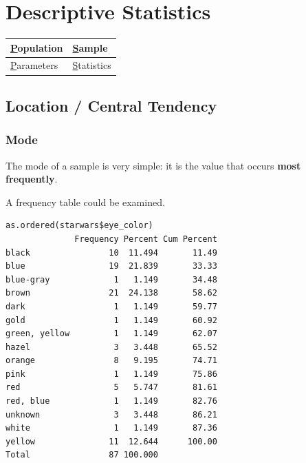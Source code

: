 \documentclass[
  letterpaper,
  DIV=11,
  numbers=noendperiod]{scrartcl}
\newenvironment{Shaded}{\begin{snugshade}}{\end{snugshade}}
\newcommand{\AttributeTok}[1]{\textcolor[rgb]{0.40,0.45,0.13}{#1}}
\newcommand{\ConstantTok}[1]{\textcolor[rgb]{0.56,0.35,0.01}{#1}}
\newcommand{\FunctionTok}[1]{\textcolor[rgb]{0.28,0.35,0.67}{#1}}
\newcommand{\NormalTok}[1]{\textcolor[rgb]{0.00,0.23,0.31}{#1}}
\newcommand{\SpecialCharTok}[1]{\textcolor[rgb]{0.37,0.37,0.37}{#1}}
\begin{document}
\section{Descriptive Statistics}\label{descriptive-statistics}

\begin{longtable}[]{@{}ll@{}}
\toprule\noalign{}
\ul{P}opulation & \ul{S}ample \\
\midrule\noalign{}
\endhead
\bottomrule\noalign{}
\endlastfoot
\ul{P}arameters & \ul{S}tatistics \\
\end{longtable}

\subsection{Location / Central
Tendency}\label{location-central-tendency}

\subsubsection{Mode}\label{mode}

The mode of a sample is very simple: it is the value that occurs
\textbf{most frequently}.~

A frequency table could be examined.

\begin{Shaded}
\end{Shaded}

\begin{verbatim}
as.ordered(starwars$eye_color) 
              Frequency Percent Cum Percent
black                10  11.494       11.49
blue                 19  21.839       33.33
blue-gray             1   1.149       34.48
brown                21  24.138       58.62
dark                  1   1.149       59.77
gold                  1   1.149       60.92
green, yellow         1   1.149       62.07
hazel                 3   3.448       65.52
orange                8   9.195       74.71
pink                  1   1.149       75.86
red                   5   5.747       81.61
red, blue             1   1.149       82.76
unknown               3   3.448       86.21
white                 1   1.149       87.36
yellow               11  12.644      100.00
Total                87 100.000            
\end{verbatim}
\end{document}
